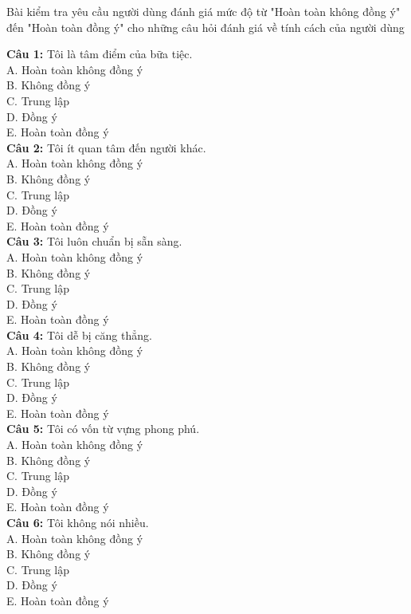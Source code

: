 Bài kiểm tra yêu cầu người dùng đánh giá mức độ từ "Hoàn toàn không đồng ý" đến "Hoàn toàn đồng ý" cho những câu hỏi đánh giá về tính cách của người dùng

\begin{multicols}{2}
\noindent
\textbf{Câu 1:} Tôi là tâm điểm của bữa tiệc. \\
A. Hoàn toàn không đồng ý \\
B. Không đồng ý \\
C. Trung lập \\
D. Đồng ý \\
E. Hoàn toàn đồng ý \\

\textbf{Câu 2:} Tôi ít quan tâm đến người khác. \\
A. Hoàn toàn không đồng ý \\
B. Không đồng ý \\
C. Trung lập \\
D. Đồng ý \\
E. Hoàn toàn đồng ý \\

\textbf{Câu 3:} Tôi luôn chuẩn bị sẵn sàng. \\
A. Hoàn toàn không đồng ý \\
B. Không đồng ý \\
C. Trung lập \\
D. Đồng ý \\
E. Hoàn toàn đồng ý \\

\textbf{Câu 4:} Tôi dễ bị căng thẳng. \\
A. Hoàn toàn không đồng ý \\
B. Không đồng ý \\
C. Trung lập \\
D. Đồng ý \\
E. Hoàn toàn đồng ý \\

\textbf{Câu 5:} Tôi có vốn từ vựng phong phú. \\
A. Hoàn toàn không đồng ý \\
B. Không đồng ý \\
C. Trung lập \\
D. Đồng ý \\
E. Hoàn toàn đồng ý \\

\textbf{Câu 6:} Tôi không nói nhiều. \\
A. Hoàn toàn không đồng ý \\
B. Không đồng ý \\
C. Trung lập \\
D. Đồng ý \\
E. Hoàn toàn đồng ý \\


\end{multicols}
